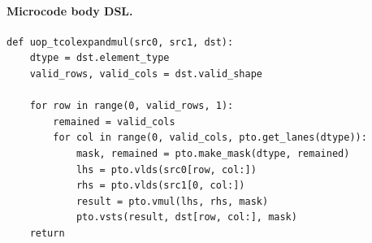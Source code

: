 \paragraph{Microcode body DSL.}
\begin{lstlisting}[style=ptocode]
def uop_tcolexpandmul(src0, src1, dst):
    dtype = dst.element_type
    valid_rows, valid_cols = dst.valid_shape

    for row in range(0, valid_rows, 1):
        remained = valid_cols
        for col in range(0, valid_cols, pto.get_lanes(dtype)):
            mask, remained = pto.make_mask(dtype, remained)
            lhs = pto.vlds(src0[row, col:])
            rhs = pto.vlds(src1[0, col:])
            result = pto.vmul(lhs, rhs, mask)
            pto.vsts(result, dst[row, col:], mask)
    return
\end{lstlisting}
\Needspace{0.34\textheight}
